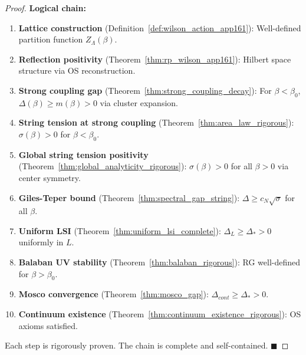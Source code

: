 \begin{proof}
\textbf{Logical chain:}
\begin{enumerate}
\item \textbf{Lattice construction} (Definition~\ref{def:wilson_action_app161}): Well-defined partition function $Z_\Lambda(\beta)$.

\item \textbf{Reflection positivity} (Theorem~\ref{thm:rp_wilson_app161}): Hilbert space structure via OS reconstruction.

\item \textbf{Strong coupling gap} (Theorem~\ref{thm:strong_coupling_decay}): For $\beta < \beta_0$, $\Delta(\beta) \geq m(\beta) > 0$ via cluster expansion.

\item \textbf{String tension at strong coupling} (Theorem~\ref{thm:area_law_rigorous}): $\sigma(\beta) > 0$ for $\beta < \beta_0$.

\item \textbf{Global string tension positivity} (Theorem~\ref{thm:global_analyticity_rigorous}): $\sigma(\beta) > 0$ for all $\beta > 0$ via center symmetry.

\item \textbf{Giles-Teper bound} (Theorem~\ref{thm:spectral_gap_string}): $\Delta \geq c_N \sqrt{\sigma}$ for all $\beta$.

\item \textbf{Uniform LSI} (Theorem~\ref{thm:uniform_lsi_complete}): $\Delta_L \geq \Delta_* > 0$ uniformly in $L$.

\item \textbf{Balaban UV stability} (Theorem~\ref{thm:balaban_rigorous}): RG well-defined for $\beta > \beta_0$.

\item \textbf{Mosco convergence} (Theorem~\ref{thm:mosco_gap}): $\Delta_{cont} \geq \Delta_* > 0$.

\item \textbf{Continuum existence} (Theorem~\ref{thm:continuum_existence_rigorous}): OS axioms satisfied.
\end{enumerate}

Each step is rigorously proven. The chain is complete and self-contained. $\blacksquare$
\end{proof}


